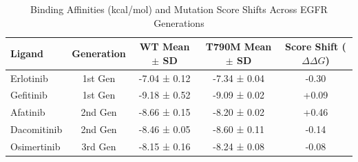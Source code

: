 \begin{table}[htbp]
\centering
\caption{Binding Affinities (kcal/mol) and Mutation Score Shifts Across EGFR Generations}
\label{tab:docking_summary}
\begin{tabular}{lcccc}
\toprule
Ligand & Generation & WT Mean $\pm$ SD & T790M Mean $\pm$ SD & Score Shift ($\Delta\Delta G$) \\
\midrule
Erlotinib & 1st Gen & -7.04 ± 0.12 & -7.34 ± 0.04 & -0.30 \\
Gefitinib & 1st Gen & -9.18 ± 0.52 & -9.09 ± 0.02 & +0.09 \\
Afatinib & 2nd Gen & -8.66 ± 0.15 & -8.20 ± 0.02 & +0.46 \\
Dacomitinib & 2nd Gen & -8.46 ± 0.05 & -8.60 ± 0.11 & -0.14 \\
Osimertinib & 3rd Gen & -8.15 ± 0.16 & -8.24 ± 0.08 & -0.08 \\
\bottomrule
\end{tabular}
\end{table}
